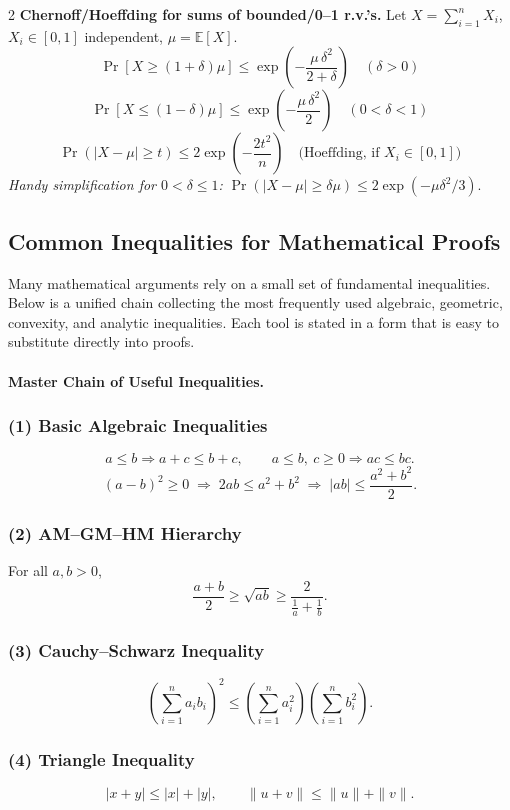 \documentclass[10pt]{article}
\theoremstyle{definition}
\begin{document}
\begin{multicols*}{2}
\noindent\textbf{Chernoff/Hoeffding for sums of bounded/0--1 r.v.'s.} Let $X=\sum_{i=1}^n X_i$, $X_i\in[0,1]$ independent, $\mu=\mathbb{E}[X]$.
\[
\Pr\!\left[X\ge (1+\delta)\mu\right]\le \exp\!\left(-\frac{\mu\,\delta^2}{2+\delta}\right)\quad(\delta>0)
\]
\[
\Pr\!\left[X\le (1-\delta)\mu\right]\le \exp\!\left(-\frac{\mu\,\delta^2}{2}\right)\quad(0<\delta<1)
\]
\[
\Pr(|X-\mu|\ge t)\le 2\exp\!\left(-\frac{2t^2}{n}\right)\quad\text{(Hoeffding, if $X_i\in[0,1]$)}
\]
\emph{Handy simplification for $0<\delta\le1$: } $\Pr(|X-\mu|\ge \delta\mu)\le 2\exp(-\mu\delta^2/3)$.
\subsection{Common Inequalities for Mathematical Proofs}
Many mathematical arguments rely on a small set of fundamental inequalities.
Below is a unified chain collecting the most frequently used algebraic,
geometric, convexity, and analytic inequalities.  Each tool is stated in a form
that is easy to substitute directly into proofs.
\paragraph{Master Chain of Useful Inequalities.}

\subsubsection*{(1) Basic Algebraic Inequalities}
\[
a \le b \Rightarrow a+c \le b+c,
\qquad
a \le b,\ c \ge 0 \Rightarrow ac \le bc.
\]
\[
(a-b)^2 \ge 0
\;\Rightarrow\;
2ab \le a^2 + b^2
\;\Rightarrow\;
|ab| \le \frac{a^2 + b^2}{2}.
\]

\subsubsection*{(2) AM--GM--HM Hierarchy}
For all \(a,b>0\),
\[
\frac{a+b}{2} \ge \sqrt{ab} \ge \frac{2}{\tfrac{1}{a}+\tfrac{1}{b}}.
\]

\subsubsection*{(3) Cauchy--Schwarz Inequality}
\[
\left(\sum_{i=1}^n a_i b_i\right)^2
\le
\left(\sum_{i=1}^n a_i^2\right)
\left(\sum_{i=1}^n b_i^2\right).
\]

\subsubsection*{(4) Triangle Inequality}
\[
|x+y|\le |x|+|y|,
\qquad
\|u+v\| \le \|u\| + \|v\|.
\]


\end{multicols*}
\end{document}
